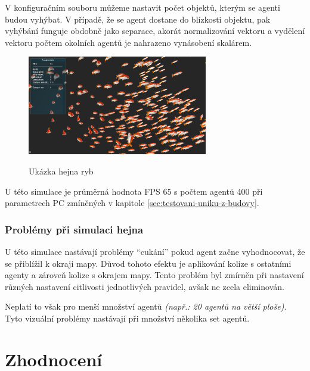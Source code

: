 \documentclass[czech,public,dept460,male,cpdeclaration]{diploma}
\begin{document}
V konfiguračním souboru můžeme nastavit počet objektů, kterým se agenti budou vyhýbat. V případě, že se agent dostane do blízkosti objektu, pak vyhýbání funguje obdobně jako separace, akorát normalizování vektoru a vydělení vektoru počtem okolních agentů je nahrazeno vynásobení skalárem.

\begin{figure}[H]\centering\includegraphics[width=0.7\textwidth]{Figures/fish4.jpg}\label{fig:fishExample}
	\caption{Ukázka hejna ryb}
	\label{fig:fishExample}
\end{figure}


U této simulace je průměrná hodnota FPS 65 s počtem agentů 400 při parametrech PC zmíněných v kapitole \ref{sec:testovani-uniku-z-budovy}.

\subsubsection{Problémy při simulaci hejna}\label{sec:problemy-pri-simulace-hejna}
U této simulace nastávají problémy ``cukání'' pokud agent začne vyhodnocovat, že se přiblížil k okraji mapy. Důvod tohoto efektu je aplikování kolize s ostatními agenty a zároveň kolize s okrajem mapy. Tento problém byl zmírněn při nastavení různých nastavení citlivosti jednotlivých pravidel, avšak ne zcela eliminován.

Neplatí to však pro menší množství agentů \textit{(např.: 20 agentů na větší ploše)}. Tyto vizuální problémy nastávají při množství několika set agentů.

\newpage
\section{Zhodnocení}

\end{document}
